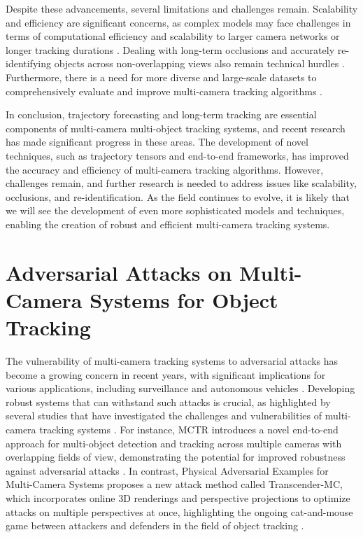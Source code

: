 \documentclass[conference]{IEEEtran}
\begin{document}
Despite these advancements, several limitations and challenges remain. Scalability and efficiency are significant concerns, as complex models may face challenges in terms of computational efficiency and scalability to larger camera networks or longer tracking durations \cite{MCTR: Multi Camera Tracking Transformer}. Dealing with long-term occlusions and accurately re-identifying objects across non-overlapping views also remain technical hurdles \cite{Challenge of Multi-Camera Tracking}. Furthermore, there is a need for more diverse and large-scale datasets to comprehensively evaluate and improve multi-camera tracking algorithms \cite{Multi-Camera Trajectory Forecasting: Pedestrian Trajectory Prediction in a Network of Cameras}.

In conclusion, trajectory forecasting and long-term tracking are essential components of multi-camera multi-object tracking systems, and recent research has made significant progress in these areas. The development of novel techniques, such as trajectory tensors and end-to-end frameworks, has improved the accuracy and efficiency of multi-camera tracking algorithms. However, challenges remain, and further research is needed to address issues like scalability, occlusions, and re-identification. As the field continues to evolve, it is likely that we will see the development of even more sophisticated models and techniques, enabling the creation of robust and efficient multi-camera tracking systems.

\section{Adversarial Attacks on Multi-Camera Systems for Object Tracking}
The vulnerability of multi-camera tracking systems to adversarial attacks has become a growing concern in recent years, with significant implications for various applications, including surveillance and autonomous vehicles \cite{MCTR}. Developing robust systems that can withstand such attacks is crucial, as highlighted by several studies that have investigated the challenges and vulnerabilities of multi-camera tracking systems \cite{Physical Adversarial Examples for Multi-Camera Systems}. For instance, MCTR introduces a novel end-to-end approach for multi-object detection and tracking across multiple cameras with overlapping fields of view, demonstrating the potential for improved robustness against adversarial attacks \cite{MCTR}. In contrast, Physical Adversarial Examples for Multi-Camera Systems proposes a new attack method called Transcender-MC, which incorporates online 3D renderings and perspective projections to optimize attacks on multiple perspectives at once, highlighting the ongoing cat-and-mouse game between attackers and defenders in the field of object tracking \cite{Physical Adversarial Examples for Multi-Camera Systems}.
\end{document}
